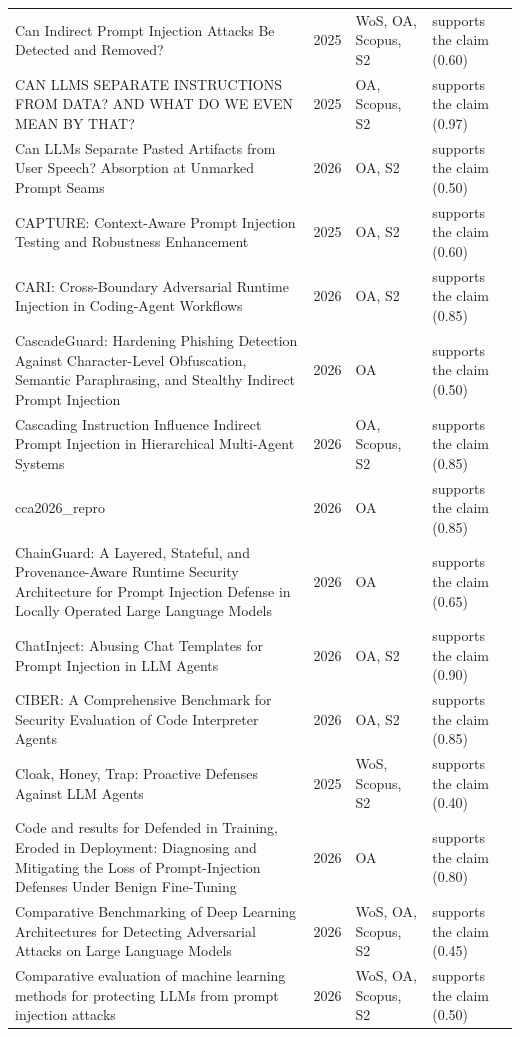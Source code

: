\begin{longtable}{@{}%
  >{\raggedright\arraybackslash}p{}c%
  >{\raggedright\arraybackslash}p{}%
  >{\raggedright\arraybackslash}p{}@{}}
Can Indirect Prompt Injection Attacks Be Detected and Removed? & 2025 & WoS, OA, Scopus, S2 & supports the claim (0.60) \\
CAN LLMS SEPARATE INSTRUCTIONS FROM DATA? AND WHAT DO WE EVEN MEAN BY THAT? & 2025 & OA, Scopus, S2 & supports the claim (0.97) \\
Can LLMs Separate Pasted Artifacts from User Speech? Absorption at Unmarked Prompt Seams & 2026 & OA, S2 & supports the claim (0.50) \\
CAPTURE: Context-Aware Prompt Injection Testing and Robustness Enhancement & 2025 & OA, S2 & supports the claim (0.60) \\
CARI: Cross-Boundary Adversarial Runtime Injection in Coding-Agent Workflows & 2026 & OA, S2 & supports the claim (0.85) \\
CascadeGuard: Hardening Phishing Detection Against Character-Level Obfuscation, Semantic Paraphrasing, and Stealthy Indirect Prompt Injection & 2026 & OA & supports the claim (0.50) \\
Cascading Instruction Influence Indirect Prompt Injection in Hierarchical Multi-Agent Systems & 2026 & OA, Scopus, S2 & supports the claim (0.85) \\
cca2026\_repro & 2026 & OA & supports the claim (0.85) \\
ChainGuard: A Layered, Stateful, and Provenance-Aware Runtime Security Architecture for Prompt Injection Defense in Locally Operated Large Language Models & 2026 & OA & supports the claim (0.65) \\
ChatInject: Abusing Chat Templates for Prompt Injection in LLM Agents & 2026 & OA, S2 & supports the claim (0.90) \\
CIBER: A Comprehensive Benchmark for Security Evaluation of Code Interpreter Agents & 2026 & OA, S2 & supports the claim (0.85) \\
Cloak, Honey, Trap: Proactive Defenses Against LLM Agents & 2025 & WoS, Scopus, S2 & supports the claim (0.40) \\
Code and results for \textquotedbl{}Defended in Training, Eroded in Deployment: Diagnosing and Mitigating the Loss of Prompt-Injection Defenses Under Benign Fine-Tuning\textquotedbl{} & 2026 & OA & supports the claim (0.80) \\
Comparative Benchmarking of Deep Learning Architectures for Detecting Adversarial Attacks on Large Language Models & 2026 & WoS, OA, Scopus, S2 & supports the claim (0.45) \\
Comparative evaluation of machine learning methods for protecting LLMs from prompt injection attacks & 2026 & WoS, OA, Scopus, S2 & supports the claim (0.50) \\

\end{longtable}
